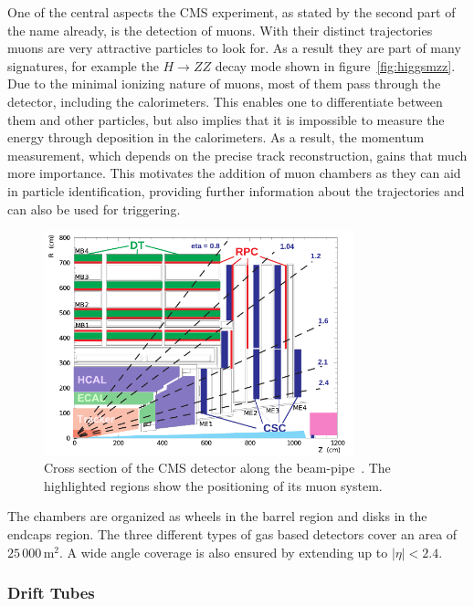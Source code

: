 One of the central aspects the CMS experiment, as stated by the second part of the name already, is the detection of muons. With their distinct trajectories muons are very attractive particles to look for. As a result they are part of many signatures, for example the $H \rightarrow ZZ$ decay mode shown in figure~\ref{fig:higgsmzz}. Due to the minimal ionizing nature of muons, most of them pass through the detector, including the calorimeters. This enables one to differentiate between them and other particles, but also implies that it is impossible to measure the energy through deposition in the calorimeters. As a result, the momentum measurement, which depends on the precise track reconstruction, gains that much more importance. This motivates the addition of muon chambers as they can aid in particle identification, providing further information about the trajectories and can also be used for triggering.

\begin{figure}[!htb]
  \centering
  \includegraphics[width=0.8\textwidth]{plots/muonsys.pdf}
  \caption{Cross section of the CMS detector along the beam-pipe~\cite{muonid2}. The highlighted regions show the positioning of its muon system.}
  \label{fig:muonsys}
\end{figure}

The chambers are organized as wheels in the barrel region and disks in the endcaps region. The three different types of gas based detectors cover an area of $25\,000\,\text{m}^2$. A wide angle coverage is also ensured by extending up to $|\eta| < 2.4$.

\subsubsection{Drift Tubes}
\label{sec:drift-tubes}


